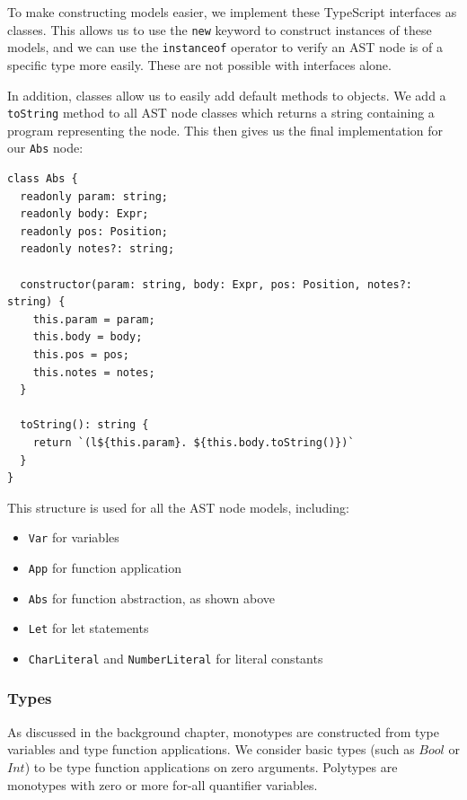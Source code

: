 \documentclass[a4paper,fleqn,oneside,12pt]{report}
\begin{document}
To make constructing models easier, we implement these TypeScript interfaces as classes. This allows us to use the \texttt{new} keyword to construct instances of these models, and we can use the \texttt{instanceof} operator to verify an AST node is of a specific type more easily. These are not possible with interfaces alone.

In addition, classes allow us to easily add default methods to objects. We add a \texttt{toString} method to all AST node classes which returns a string containing a program representing the node. This then gives us the final implementation for our \texttt{Abs} node:

\begin{verbatim}
class Abs {
  readonly param: string;
  readonly body: Expr;
  readonly pos: Position;
  readonly notes?: string;

  constructor(param: string, body: Expr, pos: Position, notes?: string) {
    this.param = param;
    this.body = body;
    this.pos = pos;
    this.notes = notes;
  }

  toString(): string {
    return `(l${this.param}. ${this.body.toString()})`
  }
}
\end{verbatim}

This structure is used for all the AST node models, including:
\begin{itemize}
  \item \texttt{Var} for variables
  \item \texttt{App} for function application
  \item \texttt{Abs} for function abstraction, as shown above
  \item \texttt{Let} for let statements
  \item \texttt{CharLiteral} and \texttt{NumberLiteral} for literal constants
\end{itemize}

\subsubsection{Types}\label{id:h.bzdo56ibho4h}

As discussed in the background chapter, monotypes are constructed from type variables and type function applications. We consider basic types (such as $Bool$ or $Int$) to be type function applications on zero arguments. Polytypes are monotypes with zero or more for-all quantifier variables.
\end{document}

